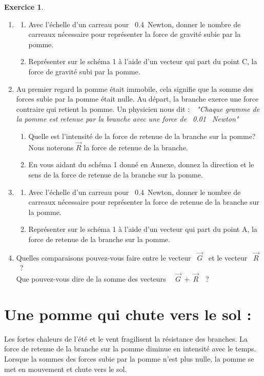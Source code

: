 \documentclass[a4paper,10.9pt]{article}
\theoremstyle{definition}
\newtheorem{exo}{Exercice}
\newcommand{\V}{\overrightarrow}
\begin{document}
\begin{exo}
\begin{enumerate}
	\item \begin{enumerate}
		\item Avec l'échelle d'un carreau pour ~0.4~Newton, donner le nombre de carreaux nécessaire pour représenter la force de gravité subie par la pomme.
		\item Représenter sur le schéma 1 à l'aide d'un vecteur qui part du point C, la force de gravité subi par la pomme.
	\end{enumerate}
	\item Au premier regard la pomme était immobile, cela signifie que la somme des forces subie par la pomme était nulle. Au départ, la branche exerce une force contraire qui retient la pomme. Un physicien nous dit :~~\textit{"Chaque gramme de la pomme est retenue par la branche avec une force de ~0.01~ Newton"} \\
	\begin{enumerate}
		\item Quelle est l'intensité de la force de retenue de la branche sur la pomme? Nous noterons $\V{R}$ la force de retenue de la branche.
		\item En vous aidant du schéma 1 donné en Annexe, donnez la direction et le sens de la force de retenue de la branche sur la pomme.\\
	\end{enumerate}
	\item
	 \begin{enumerate}
		\item Avec l'échelle d'un carreau pour ~0.4~Newton, donner le nombre de carreaux nécessaire pour représenter la force de retenue de la branche sur la pomme.
		\item Représenter sur le schéma 1 à l'aide d'un vecteur qui part du point A, la force de retenue de la branche sur la pomme.\\
	\end{enumerate}
	\item Quelles comparaisons pouvez-vous faire entre le vecteur ~$\V{G}$~ et le vecteur ~$\V{R}$~? \\Que pouvez-vous dire de la somme des vecteurs ~~$\V{G} \ + \ \V{R}$~~?
\end{enumerate}
\chead{}\rfoot{\textbf{}}\renewcommand{\headrulewidth}{0.4pt}\renewcommand{\footrulewidth}{0.4pt}
\section*{Une pomme qui chute vers le sol :}
\noindent Les fortes chaleurs de l'été et le vent fragilisent la résistance des branches. La force de retenue de la branche sur la pomme diminue en intensité avec le temps. Lorsque la sommes des forces subie par la pomme n'est plus nulle, la pomme se met en mouvement et chute vers le sol.\\


\end{exo}
\end{document}
